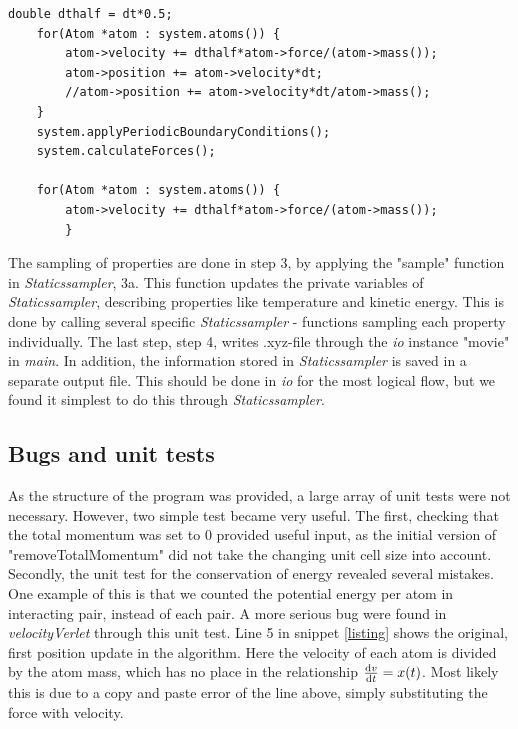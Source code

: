 \begin{lstlisting}[caption = {Snippet showing the main part of velocity verlet algorithm as applied in \textit{VelocityVerlet}}, label = {listing}]
	double dthalf = dt*0.5;
	for(Atom *atom : system.atoms()) {
		atom->velocity += dthalf*atom->force/(atom->mass());
		atom->position += atom->velocity*dt; 
		//atom->position += atom->velocity*dt/atom->mass();
	}
	system.applyPeriodicBoundaryConditions();
	system.calculateForces();
	
	for(Atom *atom : system.atoms()) {
		atom->velocity += dthalf*atom->force/(atom->mass());
		}

\end{lstlisting}		
 
 The sampling of properties are done in step 3, by applying the "sample" function in \textit{Staticssampler}, 3a. This function updates the private variables of  \textit{Staticssampler}, describing properties like temperature and kinetic energy. This is done by calling several specific \textit{Staticssampler} - functions sampling each property individually. The last step, step 4, writes .xyz-file through the \textit{io} instance "movie" in \textit{main}. In addition, the information stored in \textit{Staticssampler} is saved in a separate output file. This should be done in \textit{io} for the most logical flow, but we found it simplest to do this through \textit{Staticssampler}. 
  


\subsection{Bugs and unit tests}

As the structure  of the program was provided, a large array of unit tests were not necessary. However, two simple test became very useful. The first, checking that the total momentum was set to 0 provided useful input, as the initial version of "removeTotalMomentum" did not take the changing unit cell size into account. Secondly, the unit test for the conservation of energy revealed several mistakes. One example of this is that we counted the potential energy per atom in interacting pair, instead of each pair. A more serious bug were found in \textit{velocityVerlet} through this unit test. Line 5 in snippet \ref{listing} shows the original, first position update in the algorithm. Here the velocity of each atom is divided by the atom mass, which has no place in the relationship $ \dv{v}{t} = x(t) $. Most likely this is due to a copy and paste error of the line above, simply substituting the force with velocity. 








